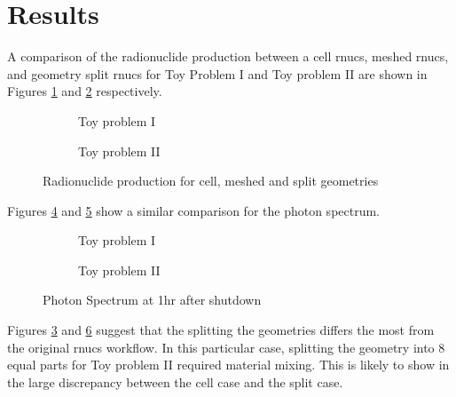 \section{Results}

A comparison of the radionuclide production between a cell rnucs, meshed rnucs, and geometry split rnucs  for Toy Problem 
I and Toy problem II are shown 
in Figures \ref{1prod_cell_2x} and \ref{2prod_cell_2x} respectively. \\
\begin{figure}[h]
 \begin{centering}
 \centering
 \begin{subfigure}[b]{.45\textwidth}
 \caption{Toy problem I }
 \label{1prod_cell_2x}
 \end{subfigure}
 \hspace{0.05cm}
 \begin{subfigure}[b]{.45\textwidth}
 \centering
 \caption{Toy problem II}
 \label{2prod_cell_2x}
 \end{subfigure}
 \caption{Radionuclide production for cell, meshed and split geometries}
 \label{prod_cell_2x}
 \end{centering}
\end{figure}

Figures \ref{1spect_cell_2x} and \ref{2spect_cell_2x} show a similar comparison for the photon spectrum.  \\

\begin{figure}[h]
 \begin{centering}
 \centering
 \begin{subfigure}[b]{.45\textwidth}
 \caption{Toy problem I }
 \label{1spect_cell_2x}
 \end{subfigure}
 \hspace{0.05cm}
 \begin{subfigure}[b]{.45\textwidth}
 \centering
 \caption{Toy problem II}
 \label{2spect_cell_2x}
 \end{subfigure}
 \caption{Photon Spectrum at 1hr after shutdown }
 \label{spect_cell_2x}
 \end{centering}
\end{figure}

Figures \ref{prod_cell_2x} and \ref{spect_cell_2x} suggest that the splitting the geometries 
differs the most from the original rnucs workflow. In this particular case, splitting the geometry 
into 8 equal parts for Toy problem II required material mixing. This is likely to show in the large 
discrepancy between the cell case and the split case. 


